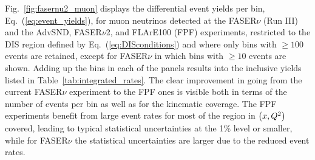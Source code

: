  Fig.~\ref{fig:fasernu2_muon} displays the differential
 event yields per bin,  Eq.~(\ref{eq:event_yields}),
 for muon neutrinos detected at the
 FASER$\nu$ (Run III) and the AdvSND, FASER$\nu$2, and FLArE100  (FPF) experiments,
 restricted
 to the DIS region defined by Eq.~(\ref{eq:DISconditions})
 and where only bins with $\ge 100$ events are retained, except for FASER$\nu$ in which bins with $\ge 10$ events are shown.
 Adding up the bins in each of the panels results into the inclusive yields listed in
 Table~\ref{tab:integrated_rates}.
 The clear improvement in going from the current FASER$\nu$ experiment
 to the FPF ones is visible both in terms
 of the number
 of events per bin as well as for the kinematic coverage.
 The FPF experiments benefit from large
 event rates for most of the region in $\left( x,Q^2\right)$ covered,
 leading to typical statistical uncertainties at the 1\% level or smaller,
 while for FASER$\nu$ the statistical uncertainties are larger due
 to the reduced event rates.
  
